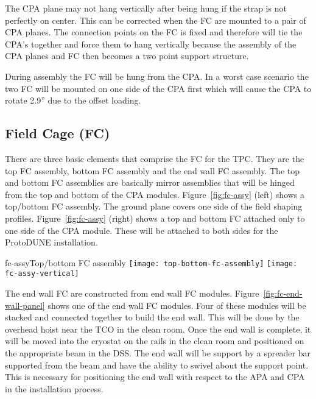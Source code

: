 The CPA plane may not hang vertically after being hung if the strap is not perfectly on center.  This can be corrected when the FC are mounted to a pair of CPA planes.  The connection points on the FC is fixed and therefore will tie the CPA’s together and force them to hang vertically because the assembly of the CPA planes and FC then becomes a two point support structure.  

During assembly the FC will be hung from the CPA.  In a worst case scenario the two FC will be mounted on one side of the CPA first which will cause the CPA to rotate 2.9'' due to the offset loading.  



\subsection{Field Cage (FC)}


There are three basic elements that comprise the FC for the TPC.  They are the top FC assembly, bottom FC assembly and the end wall FC assembly.  The top and bottom FC assemblies are basically mirror assemblies that will be hinged from the top and bottom of the CPA modules.  Figure~\ref{fig:fc-assy} (left) shows a top/bottom FC assembly.  The ground plane covers one side of the field shaping profiles.  Figure~\ref{fig:fc-assy} (right) shows a top and bottom FC attached only to one side of the CPA module.  These will be attached to both sides for the ProtoDUNE installation.  

\begin{cdrfigure}{fc-assy}{Top/bottom FC assembly }
\texttt{[image: top-bottom-fc-assembly]}
\texttt{[image: fc-assy-vertical]}
\end{cdrfigure}

The end wall FC are constructed from end wall FC modules.  Figure~\ref{fig:fc-end-wall-panel} shows one of the end wall FC modules.  Four of these modules will be stacked and connected together to build the end wall.  This will be done by the overhead hoist near the TCO in the clean room.  Once the end wall is complete, it will be moved into the cryostat on the rails in the clean room and positioned on the appropriate beam in the DSS.  The end wall will be support by a spreader bar supported from the beam and have the ability to swivel about the support point.  This is necessary for positioning the end wall with respect to the APA and CPA in the installation process.  

